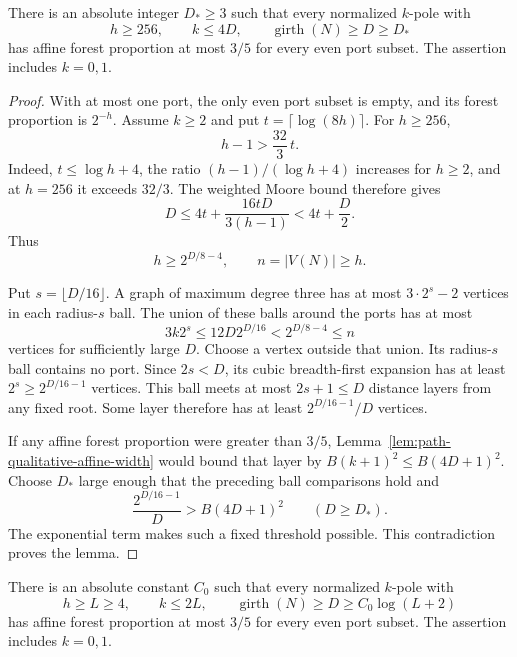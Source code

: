 \begin{lemma}
\label{lem:path-qualitative-fixed-ratio-core}
There is an absolute integer $D_*\ge3$ such that every normalized $k$-pole with
\[
 h\ge256,\qquad k\le4D,
 \qquad\operatorname{girth}(N)\ge D\ge D_*
\]
has affine forest proportion at most $3/5$ for every even port subset.
The assertion includes $k=0,1$.
\end{lemma}

\begin{proof}
With at most one port, the only even port subset is empty, and its forest proportion is $2^{-h}$.
Assume $k\ge2$ and put $t=\lceil\log(8h)\rceil$.
For $h\ge256$,
\[
 h-1>\frac{32}{3}\,t.
\]
Indeed, $t\le\log h+4$, the ratio $(h-1)/(\log h+4)$ increases for $h\ge2$, and at $h=256$ it exceeds $32/3$.
The weighted Moore bound therefore gives
\[
 D\le4t+\frac{16tD}{3(h-1)}<4t+\frac D2.
\]
Thus
\[
 h\ge2^{D/8-4},\qquad n=|V(N)|\ge h.
\]

Put $s=\lfloor D/16\rfloor$.
A graph of maximum degree three has at most $3\cdot2^s-2$ vertices in each radius-$s$ ball.
The union of these balls around the ports has at most
\[
 3k2^s\le12D2^{D/16}<2^{D/8-4}\le n
\]
vertices for sufficiently large $D$.
Choose a vertex outside that union.
Its radius-$s$ ball contains no port.
Since $2s<D$, its cubic breadth-first expansion has at least
$2^s\ge2^{D/16-1}$ vertices.
This ball meets at most $2s+1\le D$ distance layers from any fixed root.
Some layer therefore has at least $2^{D/16-1}/D$ vertices.

If any affine forest proportion were greater than $3/5$, Lemma~\ref{lem:path-qualitative-affine-width} would bound that layer by
$B(k+1)^2\le B(4D+1)^2$.
Choose $D_*$ large enough that the preceding ball comparisons hold and
\[
 \frac{2^{D/16-1}}D>B(4D+1)^2
 \qquad(D\ge D_*).
\]
The exponential term makes such a fixed threshold possible.
This contradiction proves the lemma.
\end{proof}

\begin{lemma}
\label{lem:path-clean-core-affine-forest}
There is an absolute constant $C_0$ such that every normalized $k$-pole with
\[
 h\ge L\ge4,
 \qquad k\le2L,
 \qquad\operatorname{girth}(N)\ge D\ge C_0\log(L+2)
\]
has affine forest proportion at most $3/5$ for every even port subset.
The assertion includes $k=0,1$.
\end{lemma}

